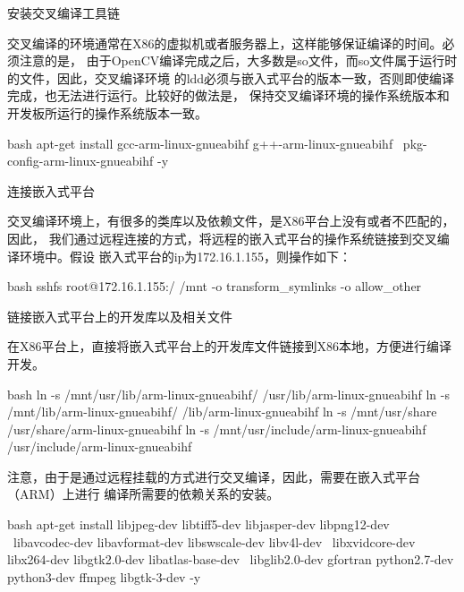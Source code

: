 \begin{outline}[enumerate]

\1 安装交叉编译工具链

交叉编译的环境通常在X86的虚拟机或者服务器上，这样能够保证编译的时间。必须注意的是，
由于OpenCV编译完成之后，大多数是so文件，而so文件属于运行时的文件，因此，交叉编译环境
的ldd必须与嵌入式平台的版本一致，否则即使编译完成，也无法进行运行。比较好的做法是，
保持交叉编译环境的操作系统版本和开发板所运行的操作系统版本一致。
\begin{code-in-enumerate}{bash}
apt-get install gcc-arm-linux-gnueabihf g++-arm-linux-gnueabihf \
    pkg-config-arm-linux-gnueabihf -y
\end{code-in-enumerate}

\1 连接嵌入式平台

交叉编译环境上，有很多的类库以及依赖文件，是X86平台上没有或者不匹配的，因此，
我们通过远程连接的方式，将远程的嵌入式平台的操作系统链接到交叉编译环境中。假设
嵌入式平台的ip为172.16.1.155，则操作如下：
\begin{code-in-enumerate}{bash}
sshfs root@172.16.1.155:/ /mnt -o transform_symlinks -o allow_other
\end{code-in-enumerate}

\1 链接嵌入式平台上的开发库以及相关文件

在X86平台上，直接将嵌入式平台上的开发库文件链接到X86本地，方便进行编译开发。
\begin{code-in-enumerate}{bash}
ln -s /mnt/usr/lib/arm-linux-gnueabihf/ /usr/lib/arm-linux-gnueabihf
ln -s /mnt/lib/arm-linux-gnueabihf/ /lib/arm-linux-gnueabihf
ln -s /mnt/usr/share /usr/share/arm-linux-gnueabihf
ln -s /mnt/usr/include/arm-linux-gnueabihf /usr/include/arm-linux-gnueabihf
\end{code-in-enumerate}

注意，由于是通过远程挂载的方式进行交叉编译，因此，需要在嵌入式平台（ARM）上进行
编译所需要的依赖关系的安装。
\begin{code-in-enumerate}{bash}
apt-get install libjpeg-dev libtiff5-dev libjasper-dev libpng12-dev \
    libavcodec-dev libavformat-dev libswscale-dev libv4l-dev \
    libxvidcore-dev libx264-dev libgtk2.0-dev libatlas-base-dev \
    libglib2.0-dev gfortran python2.7-dev python3-dev ffmpeg libgtk-3-dev -y
\end{code-in-enumerate}


\end{outline}
